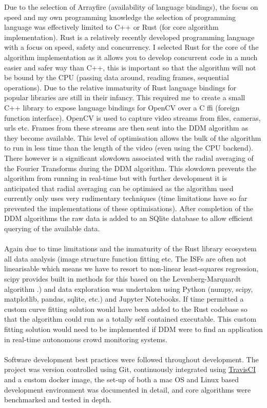 \documentclass[11pt]{article}
\begin{document}
Due to the selection of Arrayfire (availability of language bindings), the focus on speed and my own programming knowledge the selection of programming language was effectively limited to C++ or Rust \cite{rust} (for core algorithm implementation). Rust is a relatively recently developed programming language with a focus on speed, safety and concurrency. I selected Rust for the core of the algorithm implementation as it allows you to develop concurrent code in a much easier and safer way than C++, this is important so that the algorithm will not be bound by the CPU (passing data around, reading frames, sequential operations). Due to the relative immaturity of Rust language bindings for popular libraries are still in their infancy. This required me to create a small C++ library to expose language bindings for OpenCV over a C ffi (foreign function interface). OpenCV is used to capture video streams from files, cameras, urls etc. Frames from these streams are then sent into the DDM algorithm as they become available. This level of optimisation allows the bulk of the algorithm to run in less time than the length of the video (even using the CPU backend). There however is a significant slowdown associated with the radial averaging of the Fourier Transforms during the DDM algorithm. This slowdown prevents the algorithm from running in real-time but with further development it is anticipated that radial averaging can be optimised as the algorithm used currently only uses very rudimentary techniques (time limitations have so far prevented the implementations of these optimisations). After completion of the DDM algorithms the raw data is added to an SQlite database to allow efficient querying of the available data.
\\\\
Again due to time limitations and the immaturity of the Rust library ecosystem all data analysis (image structure function fitting etc. The ISFs are often not linearisable which means we have to resort to non-linear least-squares regression, scipy provides built in methods for this based on the Levenberg-Marquardt algorithm \cite{scipy_fit}.) and data exploration was undertaken using Python (numpy, scipy, matplotlib, pandas, sqlite, etc.) and Jupyter Notebooks. If time permitted a custom curve fitting solution would have been added to the Rust codebase so that the algorithm could run as a totally self contained executable. This custom fitting solution would need to be implemented if DDM were to find an application in real-time autonomous crowd monitoring systems.
\\\\
Software development best practices were followed throughout development. The project was version controlled using Git, continuously integrated using \href{https://travis-ci.com}{TravisCI} and a custom docker image, the set-up of both a mac OS and Linux based development environment was documented in detail, and core algorithms were benchmarked and tested in depth.
\\\\
\end{document}

